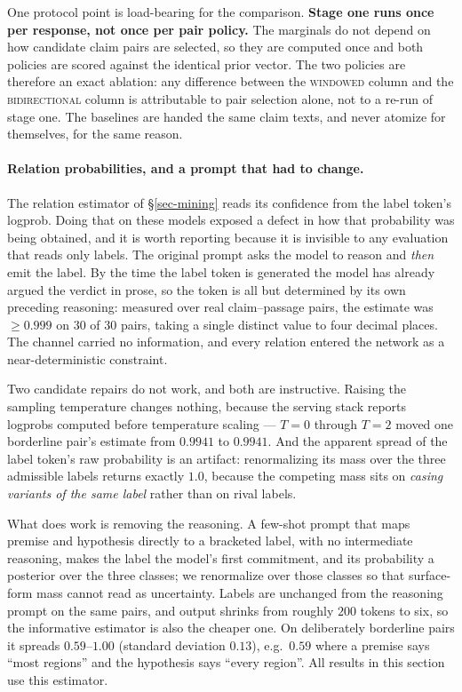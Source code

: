 One protocol point is load-bearing for the comparison. \textbf{Stage one runs once per response, not
once per pair policy.} The marginals do not depend on how candidate claim pairs are selected, so they
are computed once and both policies are scored against the identical prior vector. The two policies are
therefore an exact ablation: any difference between the \textsc{windowed} column and the
\textsc{bidirectional} column is attributable to pair selection alone, not to a re-run of stage one.
The baselines are handed the same claim texts, and never atomize for themselves, for the same reason.

\paragraph{Relation probabilities, and a prompt that had to change.} The relation estimator of
\S\ref{sec-mining} reads its confidence from the label token's logprob. Doing that on these models
exposed a defect in how that probability was being obtained, and it is worth reporting because it is
invisible to any evaluation that reads only labels. The original prompt asks the model to reason and
\emph{then} emit the label. By the time the label token is generated the model has already argued the
verdict in prose, so the token is all but determined by its own preceding reasoning: measured over
real claim--passage pairs, the estimate was $\geq 0.999$ on $30$ of $30$ pairs, taking a single
distinct value to four decimal places. The channel carried no information, and every relation entered
the network as a near-deterministic constraint.

Two candidate repairs do not work, and both are instructive. Raising the sampling temperature changes
nothing, because the serving stack reports logprobs computed before temperature scaling --- $T = 0$
through $T = 2$ moved one borderline pair's estimate from $0.9941$ to $0.9941$. And the apparent spread
of the label token's raw probability is an artifact: renormalizing its mass over the three admissible
labels returns exactly $1.0$, because the competing mass sits on \emph{casing variants of the same
label} rather than on rival labels.

What does work is removing the reasoning. A few-shot prompt that maps premise and hypothesis directly
to a bracketed label, with no intermediate reasoning, makes the label the model's first commitment, and
its probability a posterior over the three classes; we renormalize over those classes so that
surface-form mass cannot read as uncertainty. Labels are unchanged from the reasoning prompt on the
same pairs, and output shrinks from roughly $200$ tokens to six, so the informative estimator is also
the cheaper one. On deliberately borderline pairs it spreads $0.59$--$1.00$ (standard deviation
$0.13$), e.g.\ $0.59$ where a premise says ``most regions'' and the hypothesis says ``every region''.
All results in this section use this estimator.

